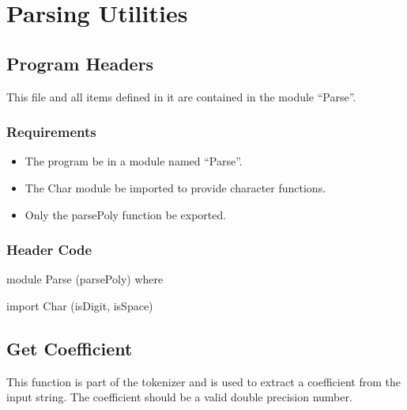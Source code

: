 \chapter{Parsing Utilities}
\section{Program Headers}
This file and all items defined in it are contained in the module ``Parse''.

\subsection{Requirements}
\begin{itemize}
\item The program  be in a module named ``Parse''.
\item The Char module  be imported to provide character functions.
\item Only the parsePoly function  be exported.
\end{itemize}

\subsection{Header Code}
\begin{code}
module Parse (parsePoly) where

import Char (isDigit, isSpace)
\end{code}

\section{Get Coefficient}
This function is part of the tokenizer and is used to extract a coefficient from the input string.  The coefficient should be a valid double precision number.
